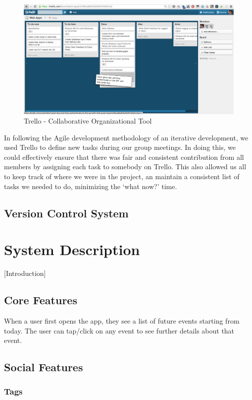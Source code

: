 \documentclass[11pt]{article}
\begin{document}
\begin{figure}[H]
\centering
\includegraphics[scale=0.35]{trello.png}
\caption{\label{fig:trello} Trello - Collaborative Organizational Tool}
\end{figure}
In following the Agile development methodology of an iterative development, we used Trello to define new tasks during our group meetings. In doing this, we could effectively ensure that there was fair and consistent contribution from all members by assigning each task to somebody on Trello. This also allowed us all to keep track of where we were in the project, an maintain a consistent list of tasks we needed to do, minimizing the `what now?' time.


\subsection {Version Control System}

\section {System Description}

[Introduction]

\subsection {Core Features}

When a user first opens the app, they see a list of future events starting from today. The user can tap/click on any event to see further details about that event.

\subsection {Social Features}
\subsubsection {Tags}
\end{document}
